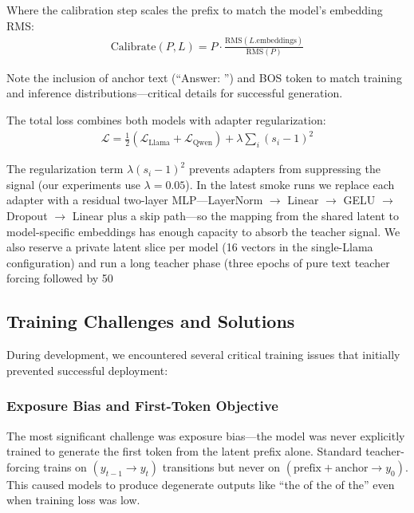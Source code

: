 \documentclass{article}
\begin{document}
Where the calibration step scales the prefix to match the model's embedding RMS:
\begin{align}
\text{Calibrate}(P, L) = P \cdot \frac{\text{RMS}(L.\text{embeddings})}{\text{RMS}(P)}
\end{align}

Note the inclusion of anchor text (``Answer: '') and BOS token to match training and inference distributions—critical details for successful generation.

The total loss combines both models with adapter regularization:
\begin{align}
\mathcal{L} = \frac{1}{2}(\mathcal{L}_{\text{Llama}} + \mathcal{L}_{\text{Qwen}}) + \lambda \sum_i (s_i - 1)^2
\end{align}

The regularization term $\lambda(s_i - 1)^2$ prevents adapters from suppressing the signal (our experiments use $\lambda=0.05$). In the latest smoke runs we replace each adapter with a residual two-layer MLP—LayerNorm $\rightarrow$ Linear $\rightarrow$ GELU $\rightarrow$ Dropout $\rightarrow$ Linear plus a skip path—so the mapping from the shared latent to model-specific embeddings has enough capacity to absorb the teacher signal. We also reserve a private latent slice per model (16 vectors in the single-Llama configuration) and run a long teacher phase (three epochs of pure text teacher forcing followed by 50%

\subsection{Training Challenges and Solutions}

During development, we encountered several critical training issues that initially prevented successful deployment:

\subsubsection{Exposure Bias and First-Token Objective}

The most significant challenge was exposure bias—the model was never explicitly trained to generate the first token from the latent prefix alone. Standard teacher-forcing trains on $(y_{t-1} \rightarrow y_t)$ transitions but never on $(\text{prefix} + \text{anchor} \rightarrow y_0)$. This caused models to produce degenerate outputs like ``the of the of the'' even when training loss was low.
\end{document}
